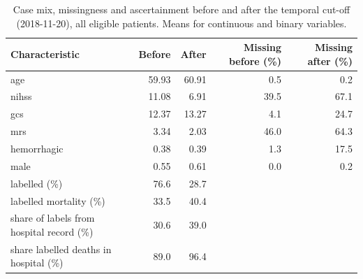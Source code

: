 \begin{table}[htbp]\centering\scriptsize
\caption{Case mix, missingness and ascertainment before and after the temporal cut-off (2018-11-20), all eligible patients. Means for continuous and binary variables.}\label{tab:tempshift}
\begin{tabular}{>{\raggedright\arraybackslash}p{5.6cm}rrrr}
\toprule
Characteristic & Before & After & Missing before (\%) & Missing after (\%) \\
\midrule
age & 59.93 & 60.91 & 0.5 & 0.2 \\
nihss & 11.08 & 6.91 & 39.5 & 67.1 \\
gcs & 12.37 & 13.27 & 4.1 & 24.7 \\
mrs & 3.34 & 2.03 & 46.0 & 64.3 \\
hemorrhagic & 0.38 & 0.39 & 1.3 & 17.5 \\
male & 0.55 & 0.61 & 0.0 & 0.2 \\
labelled (\%) & 76.6 & 28.7 &  &  \\
labelled mortality (\%) & 33.5 & 40.4 &  &  \\
share of labels from hospital record (\%) & 30.6 & 39.0 &  &  \\
share labelled deaths in hospital (\%) & 89.0 & 96.4 &  &  \\
\bottomrule
\end{tabular}
\end{table}
